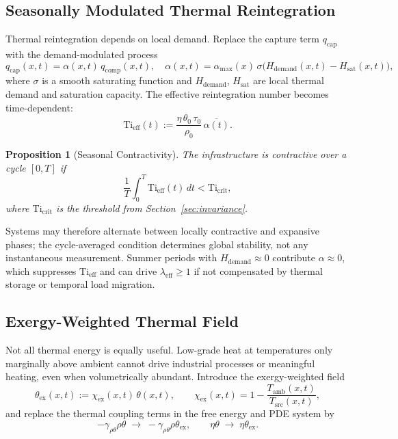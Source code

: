 \documentclass[10pt,twocolumn]{article}
\theoremstyle{plain}
\newtheorem{proposition}[theorem]{Proposition}
\theoremstyle{definition}
\theoremstyle{remark}
\begin{document}
\subsection{Seasonally Modulated Thermal Reintegration}

Thermal reintegration depends on local demand. Replace the capture
term $q_{\mathrm{cap}}$ with the demand-modulated process
\[
  q_{\mathrm{cap}}(x,t)
  = \alpha(x,t)\, q_{\mathrm{comp}}(x,t),
  \quad
  \alpha(x,t)
  = \alpha_{\max}(x)\,
    \sigma\!\bigl(H_{\mathrm{demand}}(x,t) - H_{\mathrm{sat}}(x,t)\bigr),
\]
where $\sigma$ is a smooth saturating function and
$H_{\mathrm{demand}}$, $H_{\mathrm{sat}}$ are local thermal demand and
saturation capacity. The effective reintegration number becomes
time-dependent:
\[
  \mathrm{Ti}_{\mathrm{eff}}(t)
  := \frac{\eta\,\theta_0\,\tau_0}{\rho_0}\,\overline{\alpha(t)}.
\]

\begin{proposition}[Seasonal Contractivity]
The infrastructure is contractive over a cycle $[0,T]$ if
\[
  \frac{1}{T}\int_0^T \mathrm{Ti}_{\mathrm{eff}}(t)\,dt
  < \mathrm{Ti}_{\mathrm{crit}},
\]
where $\mathrm{Ti}_{\mathrm{crit}}$ is the threshold from
Section~\ref{sec:invariance}.
\end{proposition}

Systems may therefore alternate between locally contractive and
expansive phases; the cycle-averaged condition determines global
stability, not any instantaneous measurement. Summer periods with
$H_{\mathrm{demand}} \approx 0$ contribute $\alpha \approx 0$, which
suppresses $\mathrm{Ti}_{\mathrm{eff}}$ and can drive
$\lambda_{\mathrm{eff}} \geq 1$ if not compensated by thermal storage
or temporal load migration.

\subsection{Exergy-Weighted Thermal Field}

Not all thermal energy is equally useful. Low-grade heat at
temperatures only marginally above ambient cannot drive industrial
processes or meaningful heating, even when volumetrically abundant.
Introduce the exergy-weighted field
\[
  \theta_{\mathrm{ex}}(x,t)
  := \chi_{\mathrm{ex}}(x,t)\,\theta(x,t),
  \qquad
  \chi_{\mathrm{ex}}(x,t)
  = 1 - \frac{T_{\mathrm{amb}}(x,t)}{T_{\mathrm{src}}(x,t)},
\]
and replace the thermal coupling terms in the free energy and PDE
system by
\[
  -\gamma_{\rho\theta}\rho\theta
  \;\to\;
  -\gamma_{\rho\theta}\rho\theta_{\mathrm{ex}},
  \qquad
  \eta\theta
  \;\to\;
  \eta\theta_{\mathrm{ex}}.
\]
\end{document}
